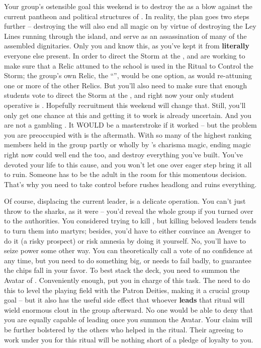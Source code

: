 \documentclass[char]{GL2020}
\begin{document}
Your group's ostensible goal this weekend is to destroy the \pSc{} as a blow against the current pantheon and political structures of \pEarth{}. In reality, the plan goes two steps further -- destroying the \pSc{} will also end all magic on \pEarth{} by virtue of destroying the Ley Lines running through the island, and serve as an assassination of many of the assembled dignitaries. Only you and \cChupLeader{} know this, as you've kept it from \textbf{literally} everyone else present. In order to direct the Storm at the \pSc{}, \cChupLeader{} and \cChupInventor{} are working to make sure that a Relic attuned to the school is used in the Ritual to Control the Storm; the group's own Relic, the ``\iHorseshoe{}'', would be one option, as would re-attuning one or more of the other Relics. But you'll also need to make sure that enough students vote to direct the Storm at the \pSc{}, and right now your only student operative is \cChupStudent{\full}. Hopefully recruitment this weekend will change that. Still, you'll only get one chance at this and getting it to work is already uncertain. And you are not a gambling . It WOULD be a masterstroke if it worked -- but the problem you are preoccupied with is the aftermath. With so many of the highest ranking members held in the group partly or wholly by \cChupLeader{}'s charisma magic, ending magic right now could well end the \pGoaties{} too, and destroy everything you've built. You've devoted your life to this cause, and you won't let one over eager step bring it all to ruin. Someone has to be the adult in the room for this momentous decision. That's why you need to take control before \cChupLeader{} rushes headlong and ruins everything.

Of course, displacing the current leader, \cChupLeader{} is a delicate operation. You can't just throw \cChupLeader{\them} to the sharks, as it were – you'd reveal the whole group if you turned \cChupLeader{\them} over to the authorities. You considered trying to kill \cChupLeader{\them}, but killing beloved leaders tends to turn them into martyrs; besides, you'd have to either convince an Avenger to do it (a risky prospect) or risk amnesia by doing it yourself. No, you'll have to seize power some other way. You can theoretically call a vote of no confidence at any time, but you need to do something big, or \cChupLeader{} needs to fail badly, to guarantee the chips fall in your favor. To best stack the deck, you need to summon the Avatar of \cGenesis{}. Conveniently enough, \cChupLeader{} put you in charge of this task. The \pGoaties{} need to do this to level the playing field with the Patron Deities, making it a crucial group goal -- but it also has the useful side effect that whoever \textbf{leads} that ritual will wield enormous clout in the group afterward. No one would be able to deny that you are equally capable of leading once you summon the Avatar. Your claim will be further bolstered by the others who helped in the ritual. Their agreeing to work under you for this ritual will be nothing short of a pledge of loyalty to you.
\end{document}
